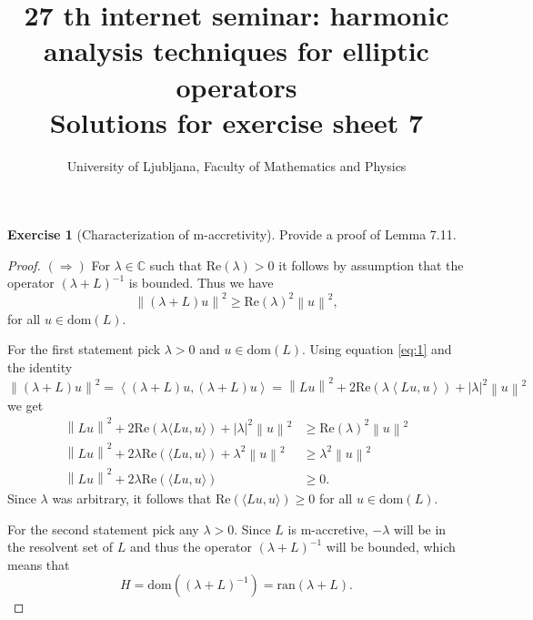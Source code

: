 \documentclass[a4paper,11pt]{article}
\newcommand{\C}{\mathbb C}
\newcommand{\abs}[1]{\left|#1\right|} %
\newcommand{\norm}[1]{\left\lVert#1\right\rVert} %
\newcommand{\re}{\mathrm{Re}}
\newcommand{\dom}{\mathrm{dom}}
\newcommand{\im}{\mathrm{ran}}
\theoremstyle{definition}
\newtheorem{exercise}{Exercise}
\begin{document}
\title{27 th internet seminar: harmonic analysis techniques for elliptic operators \\ 
Solutions for exercise sheet 7}
\author{University of Ljubljana, Faculty of Mathematics and Physics}
\date{}

\maketitle


\begin{exercise}[Characterization of m-accretivity]
    Provide a proof of Lemma 7.11.
\end{exercise}

\begin{proof}
    $(\Longrightarrow)$ For $\lambda \in \C$ such that $\re(\lambda)>0$ it follows by assumption 
    that the operator $(\lambda + L)^{-1}$ is bounded. 
    Thus we have  
    \begin{equation}\label{eq:1}
        \norm{(\lambda + L)u}^2 \ge \re(\lambda)^2 \norm{u}^2,
    \end{equation}
    for all $u \in \dom(L)$.

    For the first statement pick $\lambda > 0$ and $u \in \dom(L)$. Using equation \eqref{eq:1} and the identity 
    \[\norm{(\lambda + L)u}^2 =  \left\langle (\lambda + L)u, (\lambda + L)u \right\rangle = \norm{Lu}^2 + 2 \re(\lambda \left\langle Lu,u\right\rangle) + \abs{\lambda}^2 \norm{u}^2\]
    we get 
    \begin{align*}
    \norm{Lu}^2 + 2\re(\lambda\langle Lu, u\rangle) + \abs{\lambda}^2 \norm{u}^2 & \ge \re(\lambda)^2 \norm{u}^2 \\
    \norm{Lu}^2 + 2 \lambda\re(\langle Lu, u\rangle) + \lambda^2 \norm{u}^2 & \ge \lambda^2 \norm{u}^2 \\
    \norm{Lu}^2 + 2 \lambda\re(\langle Lu, u\rangle)  & \ge 0.
    \end{align*}
    Since $\lambda$ was arbitrary, it follows that $\re(\langle Lu, u\rangle) \ge 0$ for all $u \in \dom(L)$.
    
    For the second statement pick any $\lambda > 0$. 
    Since $L$ is m-accretive, $-\lambda$ will be in the resolvent set of $L$ and thus the operator $(\lambda + L)^{-1}$ will be bounded, which means that 
    \[H=\dom((\lambda + L)^{-1})=\im(\lambda + L).\]


\end{proof}
\end{document}
